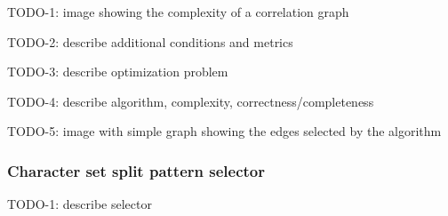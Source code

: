 TODO-1: image showing the complexity of a correlation graph

TODO-2: describe additional conditions and metrics

TODO-3: describe optimization problem

TODO-4: describe algorithm, complexity, correctness/completeness

TODO-5: image with simple graph showing the edges selected by the algorithm

\subsubsection{Character set split pattern selector}
\label{subsubsec:ps:charsetsplit}

TODO-1: describe selector


